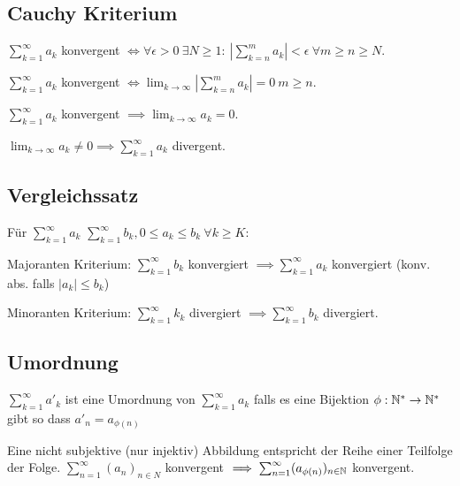 \subsection{Cauchy Kriterium}
$\sum_{k=1}^{\infty} a_k$ konvergent $\iff \forall \epsilon > 0 \ \exists N \ge 1: \ \left| \sum_{k=n}^{m} a_k \right| < \epsilon \ \forall m \ge  n \ge N$.
\begin{compactitem}
    \item $\sum_{k=1}^{\infty} a_k$ konvergent $\iff \lim_{k \to \infty} \left| \sum_{k=n}^{m} a_k \right| = 0 \ m \ge n$.
    \item $\sum_{k=1}^{\infty} a_k$ konvergent $\implies \lim_{k \to \infty} a_k = 0 $.
    \item $\lim_{k \to \infty} a_k \neq  0 \implies \sum_{k=1}^{\infty} a_k$ divergent.
\end{compactitem}

\subsection{Vergleichssatz}
Für $\sum_{k=1}^{\infty} a_k$ $\sum_{k=1}^{\infty} b_k, 0 \le a_k \le b_k \ \forall k \ge K$:
\begin{compactdesc}
\item[Majoranten Kriterium:] $\sum_{k=1}^{\infty} b_k$ konvergiert $\implies \sum_{k=1}^{\infty} a_k$ konvergiert (konv. abs. falls $|a_k| \le b_k$)
    \item[Minoranten Kriterium:] $\sum_{k=1}^{\infty} k_k$ divergiert $\implies \sum_{k=1}^{\infty} b_k$ divergiert.
\end{compactdesc}

\subsection{Umordnung}
$\sum_{k=1}^{\infty} a'_k$ ist eine Umordnung von $\sum_{k=1}^{\infty} a_k$ falls es eine Bijektion $\phi : \mathbb{N}^* \to \mathbb{N}^*$ gibt so dass $a'_n = a_{\phi(n)}$
\begin{compactitem}
\item Eine nicht subjektive (nur injektiv) Abbildung entspricht der Reihe einer Teilfolge der Folge. $\sum_{n=1}^{\infty} (a_n)_{n \in N}$ konvergent $\implies \sum_{n=1}^{\infty} (a_{\phi(n)})_{n \in \mathbb{N}}$ konvergent.
\end{compactitem}

